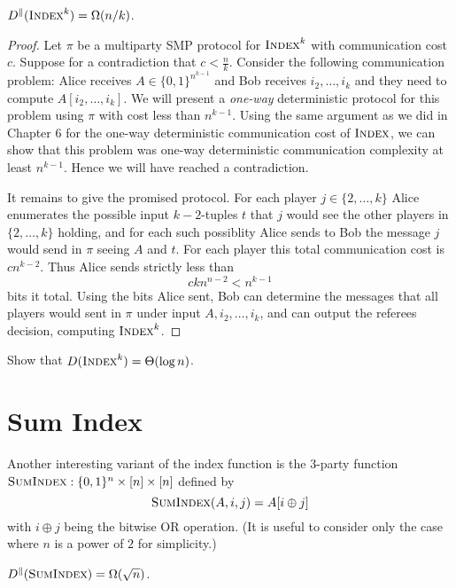 \begin{theorem}
$D^\parallel(\textsc{Index}^k) = \Omega(n/k)$.
\end{theorem}

\begin{proof}
Let $\pi$ be a multiparty SMP protocol for $\textsc{Index}^k$ with communication cost $c$. Suppose for a contradiction that $c < \frac{n}{k}$. Consider the following communication problem: Alice receives $A \in \{0,1\}^{n^{k-1}}$ and Bob receives $i_2,\dots, i_k$ and they need to compute $A[i_2,\dots, i_k]$. We will present a \emph{one-way} deterministic protocol for this problem using $\pi$ with cost less than $n^{k-1}$. Using the same argument as we did in Chapter $6$ for the one-way deterministic communication cost of $\textsc{Index}$, we can show that this problem was one-way deterministic communication complexity at least $n^{{k-1}}$. Hence we will have reached a contradiction.

It remains to give the promised protocol. For each player $j \in \{2, \dots, k\}$ Alice enumerates the possible input $k-2$-tuples $t$ that $j$ would see the other players in $\{2,\dots, k\}$ holding, and for each such possiblity Alice sends to Bob the message $j$ would send in $\pi$ seeing $A$ and $t$. For each player this total communication cost is $cn^{k-2}$. Thus Alice sends strictly less than
$$ckn^{n-2} < n^{k-1}$$
bits it total.
Using the bits Alice sent, Bob can determine the messages that all players would sent in $\pi$ under input $A,i_2,\dots, i_k$, and can output the referees decision, computing $\textsc{Index}^k$.
\end{proof}

\exercises

\begin{exercise}
Show that $D(\textsc{Index}^k) = \Theta(\log n)$.
\end{exercise}


\newpage 
\section{Sum Index}

Another interesting variant of the index function is the 3-party function $\textsc{SumIndex} : \{0,1\}^n \times [n] \times [n]$ defined by
\[
\textsc{SumIndex}(A,i,j) = A[ i \oplus j]
\]
with $i \oplus j$ being the bitwise OR operation. (It is useful to consider only the case where $n$ is a power of $2$ for simplicity.)

\begin{theorem}
$D^\parallel(\textsc{SumIndex}) = \Omega(\sqrt{n})$.
\end{theorem}

